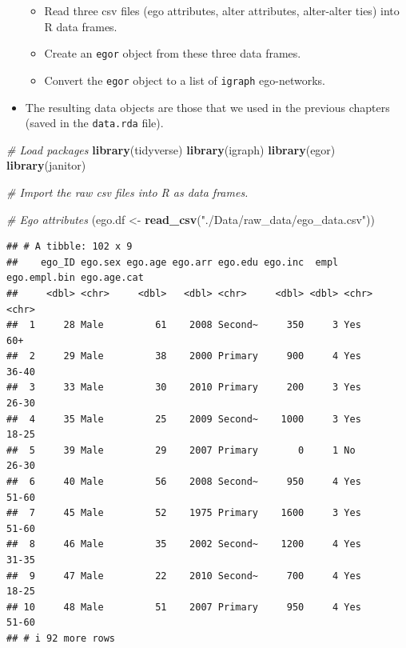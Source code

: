 \documentclass[
]{book}
\newenvironment{Shaded}{\begin{snugshade}}{\end{snugshade}}
\newcommand{\CommentTok}[1]{\textcolor[rgb]{0.56,0.35,0.01}{\textit{#1}}}
\newcommand{\FunctionTok}[1]{\textcolor[rgb]{0.13,0.29,0.53}{\textbf{#1}}}
\newcommand{\NormalTok}[1]{#1}
\newcommand{\OtherTok}[1]{\textcolor[rgb]{0.56,0.35,0.01}{#1}}
\newcommand{\StringTok}[1]{\textcolor[rgb]{0.31,0.60,0.02}{#1}}
\providecommand{\tightlist}{%
  \setlength{\itemsep}{0pt}\setlength{\parskip}{0pt}}
\begin{document}
\begin{itemize}
  \begin{itemize}
  \tightlist
  \item
    Read three csv files (ego attributes, alter attributes, alter-alter ties) into R data frames.
  \item
    Create an \texttt{egor} object from these three data frames.
  \item
    Convert the \texttt{egor} object to a list of \texttt{igraph} ego-networks.
  \end{itemize}
\item
  The resulting data objects are those that we used in the previous chapters (saved in the \texttt{data.rda} file).
\end{itemize}

\begin{Shaded}
\begin{Highlighting}[]
\CommentTok{\# Load packages}
\FunctionTok{library}\NormalTok{(tidyverse)}
\FunctionTok{library}\NormalTok{(igraph)}
\FunctionTok{library}\NormalTok{(egor)}
\FunctionTok{library}\NormalTok{(janitor)}

\CommentTok{\# Import the raw csv files into R as data frames.}

\CommentTok{\# Ego attributes}
\NormalTok{(ego.df }\OtherTok{\textless{}{-}} \FunctionTok{read\_csv}\NormalTok{(}\StringTok{"./Data/raw\_data/ego\_data.csv"}\NormalTok{))}
\end{Highlighting}
\end{Shaded}

\begin{verbatim}
## # A tibble: 102 x 9
##    ego_ID ego.sex ego.age ego.arr ego.edu ego.inc  empl ego.empl.bin ego.age.cat
##     <dbl> <chr>     <dbl>   <dbl> <chr>     <dbl> <dbl> <chr>        <chr>      
##  1     28 Male         61    2008 Second~     350     3 Yes          60+        
##  2     29 Male         38    2000 Primary     900     4 Yes          36-40      
##  3     33 Male         30    2010 Primary     200     3 Yes          26-30      
##  4     35 Male         25    2009 Second~    1000     3 Yes          18-25      
##  5     39 Male         29    2007 Primary       0     1 No           26-30      
##  6     40 Male         56    2008 Second~     950     4 Yes          51-60      
##  7     45 Male         52    1975 Primary    1600     3 Yes          51-60      
##  8     46 Male         35    2002 Second~    1200     4 Yes          31-35      
##  9     47 Male         22    2010 Second~     700     4 Yes          18-25      
## 10     48 Male         51    2007 Primary     950     4 Yes          51-60      
## # i 92 more rows
\end{verbatim}
\end{document}
